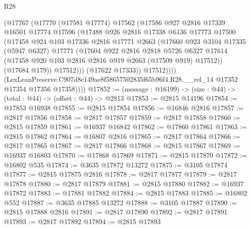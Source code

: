 \begin{lexlean}{R28}
\begin{coremodule}
                (@17767
                  (@17770
                    (@17581 @17774)
                    @17562
                    (@17586
                      @927
                      @2816
                      @17339
                      @16501
                      @17774
                      @17596
                      (@17488
                        @926
                        @2816
                        @17338
                        @6136
                        @17773
                        @17500
                        (@17458
                          @924
                          @103
                          @17336
                          @2816
                          @17771
                          @2663
                          (@17660
                            @923
                            @3104
                            @17335
                            (@5947 @6327)
                            @17771
                            (@17604
                              @922
                              @2816
                              @2818
                              @5726
                              @6327
                              @17614
                              (@17458 @920 @103 @2816 @2816 @919 @2663 (@17509 @919) @17512))
                            (@17684 @179))
                          @17512)))
                    (@17622 @17333))
                  @17512))))
          (LexLeanPreserve.C907d8c149ae8f58657502835f65b96f4.R28.__rel_14
            @17352
            @17354
            @17356
            @17358))))
@17852 := (message : @16199) -> (size : @44) -> (total : @44) -> (offset : @44) -> @2813
@17853 := @2815 @14196
@17854 := @17853 @16938
@17855 := @2815 @17854
@17856 := @16846 @2816
@17857 := @2817 @17856
@17858 := @2817 @17857
@17859 := @2817 @17858
@17860 := @2815 @17859
@17861 := @16937 @16842
@17862 := @17860 @17861
@17863 := @2815 @17862
@17864 := @16807 @2816
@17865 := @2817 @17864
@17866 := @2817 @17865
@17867 := @2817 @17866
@17868 := @2815 @17867
@17869 := @16937 @16803
@17870 := @17868 @17869
@17871 := @2815 @17870
@17872 := @16802 @535
@17874 := @3635 @17872 @13272
@17875 := @3105 @17874
@17877 := @2815 @17875 @2816
@17878 := @2817 @17877
@17879 := @2817 @17878
@17880 := @2817 @17879
@17881 := @2815 @17880
@17882 := @16937 @17872
@17883 := @17881 @17882
@17884 := @2815 @17883
@17885 := @16802 @552
@17887 := @3635 @17885 @13272
@17888 := @3105 @17887
@17890 := @2815 @17888 @2816
@17891 := @2817 @17890
@17892 := @2817 @17891
@17893 := @2817 @17892
@17894 := @2815 @17893

\end{coremodule}
\end{lexlean}

